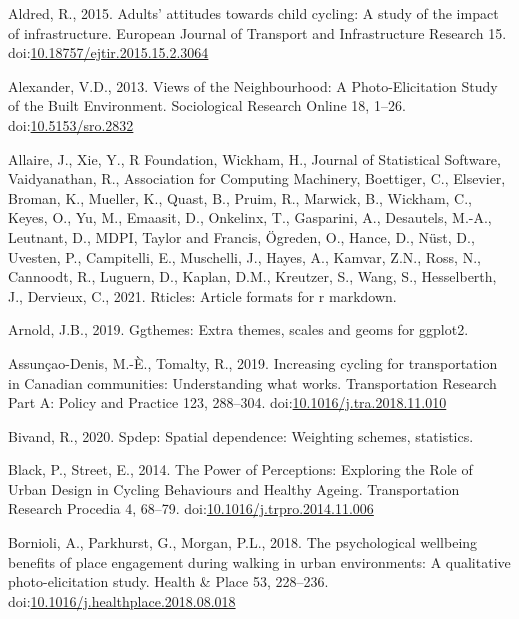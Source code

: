 \documentclass[]{elsarticle} %
\begin{document}
\leavevmode\hypertarget{ref-aldredAdultsAttitudesChild2015}{}%
Aldred, R., 2015. Adults' attitudes towards child cycling: A study of
the impact of infrastructure. European Journal of Transport and
Infrastructure Research 15.
doi:\href{https://doi.org/10.18757/ejtir.2015.15.2.3064}{10.18757/ejtir.2015.15.2.3064}

\leavevmode\hypertarget{ref-alexanderViewsNeighbourhoodPhotoElicitation2013}{}%
Alexander, V.D., 2013. Views of the Neighbourhood: A Photo-Elicitation
Study of the Built Environment. Sociological Research Online 18, 1--26.
doi:\href{https://doi.org/10.5153/sro.2832}{10.5153/sro.2832}

\leavevmode\hypertarget{ref-R-rticles}{}%
Allaire, J., Xie, Y., R Foundation, Wickham, H., Journal of Statistical
Software, Vaidyanathan, R., Association for Computing Machinery,
Boettiger, C., Elsevier, Broman, K., Mueller, K., Quast, B., Pruim, R.,
Marwick, B., Wickham, C., Keyes, O., Yu, M., Emaasit, D., Onkelinx, T.,
Gasparini, A., Desautels, M.-A., Leutnant, D., MDPI, Taylor and Francis,
Ögreden, O., Hance, D., Nüst, D., Uvesten, P., Campitelli, E.,
Muschelli, J., Hayes, A., Kamvar, Z.N., Ross, N., Cannoodt, R., Luguern,
D., Kaplan, D.M., Kreutzer, S., Wang, S., Hesselberth, J., Dervieux, C.,
2021. Rticles: Article formats for r markdown.

\leavevmode\hypertarget{ref-R-ggthemes}{}%
Arnold, J.B., 2019. Ggthemes: Extra themes, scales and geoms for
ggplot2.

\leavevmode\hypertarget{ref-assuncao-denisIncreasingCyclingTransportation2019a}{}%
Assunçao-Denis, M.-È., Tomalty, R., 2019. Increasing cycling for
transportation in Canadian communities: Understanding what works.
Transportation Research Part A: Policy and Practice 123, 288--304.
doi:\href{https://doi.org/10.1016/j.tra.2018.11.010}{10.1016/j.tra.2018.11.010}

\leavevmode\hypertarget{ref-R-spdep}{}%
Bivand, R., 2020. Spdep: Spatial dependence: Weighting schemes,
statistics.

\leavevmode\hypertarget{ref-blackPowerPerceptionsExploring2014a}{}%
Black, P., Street, E., 2014. The Power of Perceptions: Exploring the
Role of Urban Design in Cycling Behaviours and Healthy Ageing.
Transportation Research Procedia 4, 68--79.
doi:\href{https://doi.org/10.1016/j.trpro.2014.11.006}{10.1016/j.trpro.2014.11.006}

\leavevmode\hypertarget{ref-bornioliPsychologicalWellbeingBenefits2018}{}%
Bornioli, A., Parkhurst, G., Morgan, P.L., 2018. The psychological
wellbeing benefits of place engagement during walking in urban
environments: A qualitative photo-elicitation study. Health \& Place 53,
228--236.
doi:\href{https://doi.org/10.1016/j.healthplace.2018.08.018}{10.1016/j.healthplace.2018.08.018}
\end{document}
